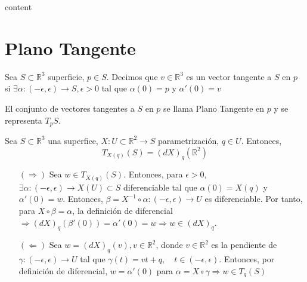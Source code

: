 \begin{dem}
  content
\end{dem}

%

\section{Plano Tangente}

\begin{defn}
  Sea $S \subset \mathbb{R}^{3}$ superficie, $p \in S$. Decimos que $v \in \mathbb{R}^{3}$ es un vector tangente a $S$ en $p$ si $\exists \alpha : (-\epsilon, \epsilon) \to S, \epsilon > 0$ tal que $\alpha(0) = p$ y $\alpha'(0) = v$
\end{defn}

\begin{nota}
  El conjunto de vectores tangentes a $S$ en $p$ se llama Plano Tangente en $p$ y se representa $T_{p}S$.
\end{nota}

\begin{prop}
  Sea $S \subset \mathbb{R}^{3}$ una superfice, $X : U \subset \mathbb{R}^{2} \to S$ parametrización, $q \in U$. Entonces,
  \[ 
    T_{X(q)}(S) = (d X)_{q}(\mathbb{R}^{2}) 
  \] 
\end{prop}

\begin{dem}
  \begin{enumerate}[label=(\roman*)]
    \item []
    \item [$(\Rightarrow)$] Sea $w \in T_{X(q)}(S)$. Entonces, para $\epsilon >0$, $\exists \alpha : (-\epsilon,\epsilon) \to X(U) \subset S$ diferenciable tal que $\alpha(0) = X(q)$ y $\alpha'(0) = w$. Entonces, $\beta = X^{-1} \circ \alpha : (-\epsilon, \epsilon) \to U$ es diferenciable. Por tanto, para $X \circ \beta = \alpha$, la definición de diferencial $\Rightarrow (d X)_{q}(\beta'(0)) = \alpha'(0) = w \Rightarrow w \in (d X)_{q}$.
    \item [$(\Leftarrow)$] Sea $w = (d X)_{q}(v), v \in \mathbb{R}^{2}$, donde $v \in \mathbb{R}^{2}$ es la pendiente de $\gamma : (-\epsilon, \epsilon) \to U$ tal que $\gamma(t) = v t + q, \quad t \in (-\epsilon, \epsilon)$. Entonces, por definición de diferencial, $w = \alpha'(0)$ para $\alpha = X \circ \gamma \Rightarrow w \in T_{q}(S)$
  \end{enumerate}
\end{dem}

